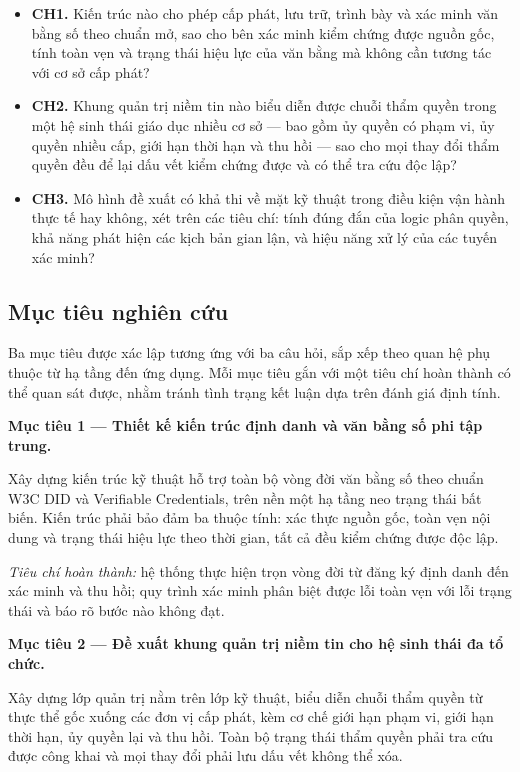 \begin{itemize}
    \item \textbf{CH1.} Kiến trúc nào cho phép cấp phát, lưu trữ, trình bày và xác minh văn bằng số theo chuẩn mở, sao cho bên xác minh kiểm chứng được nguồn gốc, tính toàn vẹn và trạng thái hiệu lực của văn bằng mà không cần tương tác với cơ sở cấp phát?
    \item \textbf{CH2.} Khung quản trị niềm tin nào biểu diễn được chuỗi thẩm quyền trong một hệ sinh thái giáo dục nhiều cơ sở --- bao gồm ủy quyền có phạm vi, ủy quyền nhiều cấp, giới hạn thời hạn và thu hồi --- sao cho mọi thay đổi thẩm quyền đều để lại dấu vết kiểm chứng được và có thể tra cứu độc lập?
    \item \textbf{CH3.} Mô hình đề xuất có khả thi về mặt kỹ thuật trong điều kiện vận hành thực tế hay không, xét trên các tiêu chí: tính đúng đắn của logic phân quyền, khả năng phát hiện các kịch bản gian lận, và hiệu năng xử lý của các tuyến xác minh?
\end{itemize}

\subsection{Mục tiêu nghiên cứu}

Ba mục tiêu được xác lập tương ứng với ba câu hỏi, sắp xếp theo quan hệ phụ thuộc từ hạ tầng đến ứng dụng. Mỗi mục tiêu gắn với một tiêu chí hoàn thành có thể quan sát được, nhằm tránh tình trạng kết luận dựa trên đánh giá định tính.

\noindent \textbf{Mục tiêu 1 --- Thiết kế kiến trúc định danh và văn bằng số phi tập trung.}

Xây dựng kiến trúc kỹ thuật hỗ trợ toàn bộ vòng đời văn bằng số theo chuẩn W3C DID và Verifiable Credentials, trên nền một hạ tầng neo trạng thái bất biến. Kiến trúc phải bảo đảm ba thuộc tính: xác thực nguồn gốc, toàn vẹn nội dung và trạng thái hiệu lực theo thời gian, tất cả đều kiểm chứng được độc lập.

\textit{Tiêu chí hoàn thành:} hệ thống thực hiện trọn vòng đời từ đăng ký định danh đến xác minh và thu hồi; quy trình xác minh phân biệt được lỗi toàn vẹn với lỗi trạng thái và báo rõ bước nào không đạt.

\noindent \textbf{Mục tiêu 2 --- Đề xuất khung quản trị niềm tin cho hệ sinh thái đa tổ chức.}

Xây dựng lớp quản trị nằm trên lớp kỹ thuật, biểu diễn chuỗi thẩm quyền từ thực thể gốc xuống các đơn vị cấp phát, kèm cơ chế giới hạn phạm vi, giới hạn thời hạn, ủy quyền lại và thu hồi. Toàn bộ trạng thái thẩm quyền phải tra cứu được công khai và mọi thay đổi phải lưu dấu vết không thể xóa.

